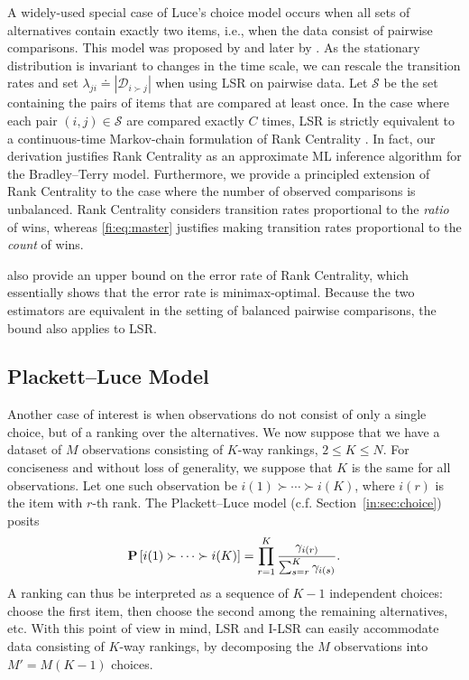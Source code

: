 A widely-used special case of Luce's choice model occurs when all sets of alternatives contain exactly two items, i.e., when the data consist of pairwise comparisons.
This model was proposed by \citet{zermelo1928berechnung} and later by \citet{bradley1952rank}.
As the stationary distribution is invariant to changes in the time scale, we can rescale the transition rates and set $\lambda_{ji} \doteq |\mathcal{D}_{i \succ j}|$ when using LSR on pairwise data.
Let $\mathcal{S}$ be the set containing the pairs of items that are compared at least once.
In the case where each pair $(i, j) \in \mathcal{S}$ are compared exactly $C$ times, LSR is strictly equivalent to a continuous-time Markov-chain formulation of Rank Centrality \citep{negahban2012iterative}.
In fact, our derivation justifies Rank Centrality as an approximate ML inference algorithm for the Bradley--Terry model.
Furthermore, we provide a principled extension of Rank Centrality to the case where the number of observed comparisons is unbalanced.
Rank Centrality considers transition rates proportional to the \emph{ratio} of wins, whereas \eqref{fi:eq:master} justifies making transition rates proportional to the \emph{count} of wins.

\citet{negahban2012iterative} also provide an upper bound on the error rate of Rank Centrality, which essentially shows that the error rate is minimax-optimal.
Because the two estimators are equivalent in the setting of balanced pairwise comparisons, the bound also applies to LSR.

\subsection{Plackett--Luce Model}
\label{fi:sec:partial}

Another case of interest is when observations do not consist of only a single choice, but of a ranking over the alternatives.
We now suppose that we have a dataset of $M$ observations consisting of $K$-way rankings, $2 \le K \le N$.
For conciseness and without loss of generality, we suppose that $K$ is the same for all observations.
Let one such observation be $i(1) \succ \cdots \succ i(K)$, where $i(r)$ is the item with $r$-th rank.
The Plackett--Luce model (c.f. Section~\ref{in:sec:choice}) posits
\begin{align*}
\mathbf{P}\left[  i(1) \succ \cdots \succ i(K)  \right]
  = \prod_{r = 1}^{K} \frac{\gamma_{i(r)}}{\sum_{s = r}^{K} \gamma_{i(s)}}.
\end{align*}
A ranking can thus be interpreted as a sequence of $K-1$ independent choices:
choose the first item, then choose the second among the remaining alternatives, etc.
With this point of view in mind, LSR and I-LSR can easily accommodate data consisting of $K$-way rankings, by decomposing the $M$ observations into $M' = M (K - 1)$ choices.

